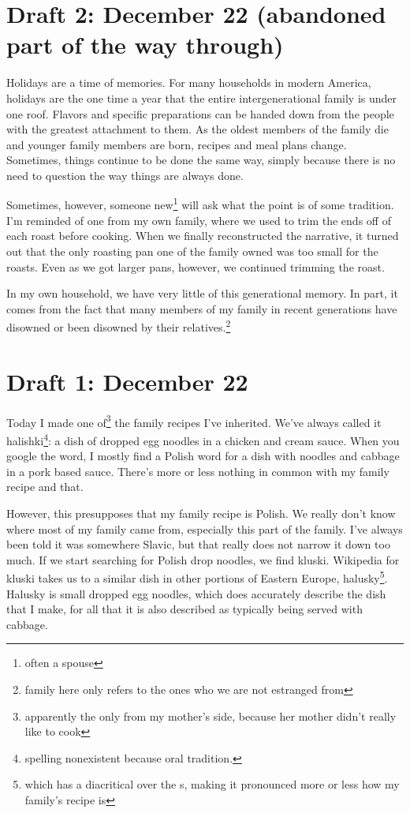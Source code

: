 \documentclass[12pt]{article}[titlepage]
\newcommand{\1}{\={a}}
\newcommand{\2}{\={e}}
\newcommand{\3}{\={\i}}
\newcommand{\4}{\=o}
\newcommand{\5}{\=u}
\newcommand{\6}{\={A}}
\renewcommand{\,}{\textsuperscript{,}}
\begin{document}
\section{Draft 2: December 22 (abandoned part of the way through)}
Holidays are a time of memories.
For many households in modern America, holidays are the one time a year that the entire intergenerational family is under one roof.
Flavors and specific preparations can be handed down from the people with the greatest attachment to them.
As the oldest members of the family die and younger family members are born, recipes and meal plans change.
Sometimes, things continue to be done the same way, simply because there is no need to question the way things are always done.

Sometimes, however, someone new\footnote{often a spouse} will ask what the point is of some tradition.
I'm reminded of one from my own family, where we used to trim the ends off of each roast before cooking.
When we finally reconstructed the narrative, it turned out that the only roasting pan one of the family owned was too small for the roasts.
Even as we got larger pans, however, we continued trimming the roast.

In my own household, we have very little of this generational memory.
In part, it comes from the fact that many members of my family in recent generations have disowned or been disowned by their relatives.\footnote{family here only refers to the ones who we are not estranged from}
\section{Draft 1: December 22}
Today I made one of\footnote{apparently the only from my mother's side, because her mother didn't really like to cook} the family recipes I've inherited.
We've always called it halishki\footnote{spelling nonexistent because oral tradition.}: a dish of dropped egg noodles in a chicken and cream sauce.
When you google the word, I mostly find a Polish word for a dish with noodles and cabbage in a pork based sauce.
There's more or less nothing in common with my family recipe and that.

However, this presupposes that my family recipe is Polish.
We really don't know where most of my family came from, especially this part of the family.
I've always been told it was somewhere Slavic, but that really does not narrow it down too much.
If we start searching for Polish drop noodles, we find kluski.
Wikipedia for kluski takes us to a similar dish in other portions of Eastern Europe, halusky\footnote{which has a diacritical over the s, making it pronounced more or less how my family's recipe is}.
Halusky is small dropped egg noodles, which does accurately describe the dish that I make, for all that it is also described as typically being served with cabbage.
\end{document}
